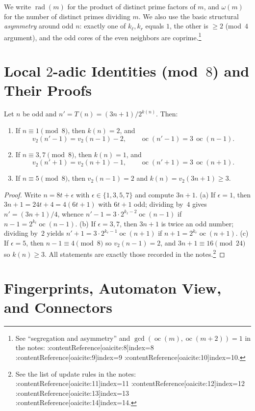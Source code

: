\documentclass[11pt]{article}
\newcommand{\vtwo}{v_{2}}
\newcommand{\oc}{\operatorname{oc}}
\newcommand{\rad}{\operatorname{rad}}
\newcommand{\omegaDistinct}{\omega} %
\begin{document}
We write $\rad(m)$ for the product of distinct prime factors of $m$,
and $\omegaDistinct(m)$ for the number of distinct primes dividing $m$.
We also use the basic structural \emph{asymmetry} around odd $n$: exactly one of
$k_\ell,k_r$ equals $1$, the other is $\ge 2$ (mod~$4$ argument), and the odd cores of the even neighbors are coprime.\footnote{See ``segregation and asymmetry'' and $\gcd(\oc(m),\oc(m+2))=1$ in the notes: :contentReference[oaicite:8]{index=8} :contentReference[oaicite:9]{index=9} :contentReference[oaicite:10]{index=10}.}

\section{Local $2$-adic Identities (mod~$8$) and Their Proofs}

\begin{lemma}\label{lem:mod8}
Let $n$ be odd and $n'=T(n)=(3n+1)/2^{k(n)}$. Then:
\begin{enumerate}[label=(\alph*)]
  \item If $n\equiv 1\pmod 8$, then $k(n)=2$, and
  \[
    \vtwo(n'-1)=\vtwo(n-1)-2,\qquad \oc(n'-1)=3\,\oc(n-1).
  \]
  \item If $n\equiv 3,7\pmod 8$, then $k(n)=1$, and
  \[
    \vtwo(n'+1)=\vtwo(n+1)-1,\qquad \oc(n'+1)=3\,\oc(n+1).
  \]
  \item If $n\equiv 5\pmod 8$, then $\vtwo(n-1)=2$ and $k(n)=\vtwo(3n+1)\ge 3$.
\end{enumerate}
\end{lemma}

\begin{proof}
Write $n=8t+\epsilon$ with $\epsilon\in\{1,3,5,7\}$ and compute $3n+1$.
(a) If $\epsilon=1$, then $3n+1=24t+4=4(6t+1)$ with $6t+1$ odd; dividing by~$4$ gives $n'=(3n+1)/4$, whence $n'-1=3\cdot 2^{k_\ell-2}\oc(n-1)$ if $n-1=2^{k_\ell}\oc(n-1)$.
(b) If $\epsilon=3,7$, then $3n+1$ is twice an odd number; dividing by~$2$ yields $n'+1=3\cdot 2^{k_r-1}\oc(n+1)$ if $n+1=2^{k_r}\oc(n+1)$.
(c) If $\epsilon=5$, then $n-1\equiv 4\pmod 8$ so $\vtwo(n-1)=2$, and $3n+1\equiv 16\pmod{24}$ so $k(n)\ge 3$.
All statements are exactly those recorded in the notes.\footnote{See the list of update rules in the notes: :contentReference[oaicite:11]{index=11} :contentReference[oaicite:12]{index=12} :contentReference[oaicite:13]{index=13} :contentReference[oaicite:14]{index=14}.}
\end{proof}

\section{Fingerprints, Automaton View, and Connectors}
\end{document}
